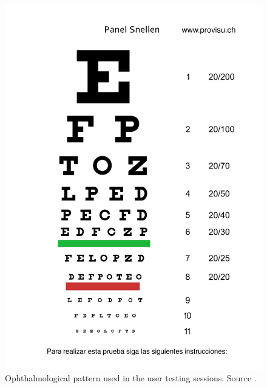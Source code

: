 \documentclass[10pt,a4paper,twocolumn,twoside]{article}
\begin{document}
	\begin{figure}
		\centering
		\includegraphics[width=1\linewidth]{img/Snellenchart_es-1.png}
		\caption{Ophthalmological pattern used in the user testing sessions. Source \cite{web:snellen}.}
		\label{fig:add:pattern}
	\end{figure}
\end{document}
